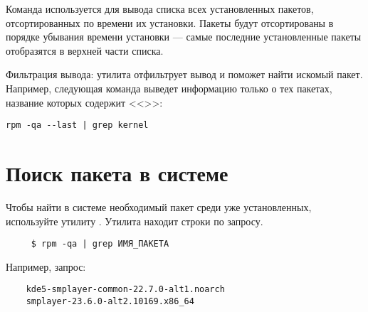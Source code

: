 Команда  используется для вывода списка всех установленных пакетов, отсортированных 
по времени их установки. Пакеты будут отсортированы в порядке убывания времени установки --- самые 
последние установленные пакеты отобразятся в верхней части списка.

Фильтрация вывода: утилита  отфильтрует вывод и поможет найти искомый пакет. Например, 
следующая команда выведет информацию только о тех пакетах, название которых содержит <<>>:

\begin{verbatim}
rpm -qa --last | grep kernel
\end{verbatim} 

\section{Поиск пакета в системе}
Чтобы найти в системе необходимый пакет среди уже установленных, используйте утилиту . Утилита  находит строки по запросу. 
\begin{verbatim}
	 $ rpm -qa | grep ИМЯ_ПАКЕТА 
\end{verbatim}

Например, запрос:
\begin{verbatim}
	kde5-smplayer-common-22.7.0-alt1.noarch
	smplayer-23.6.0-alt2.10169.x86_64
\end{verbatim}

